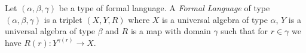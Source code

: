 \begin{defin}\label{logic:def:formal:language}
Let $(\alpha,\beta,\gamma)$ be a type of formal language. A {\em
Formal Language} of type $(\alpha,\beta,\gamma)$ is a triplet
$(X,Y,R)$ where $X$ is a universal algebra of type $\alpha$, $Y$ is
a universal algebra of type $\beta$ and $R$ is a map with domain
$\gamma$ such that for $r\in\gamma$ we have
$R(r):Y^{\gamma(r)}\rightarrow X$.
\end{defin}

